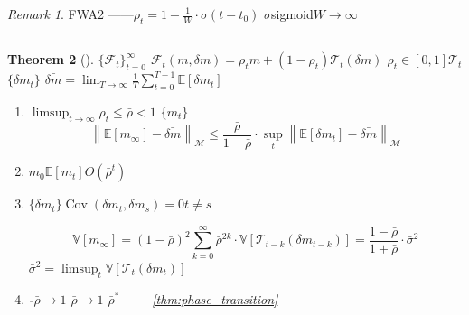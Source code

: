\documentclass[11pt,a4paper]{article}
\newtheorem{theorem}{Theorem}[section]
\theoremstyle{remark}
\newtheorem{remark}[theorem]{Remark}
\DeclareMathOperator{\Cov}{Cov}
\newcommand{\Mmem}{\mathcal{M}}
\newcommand{\Fforget}{\mathcal{F}}
\newcommand{\E}{\mathbb{E}}
\newcommand{\V}{\mathbb{V}}
\newcommand{\norm}[1]{\left\lVert#1\right\rVert}
\begin{document}
\begin{remark}
FWA2
——$\rho_t = 1 - \frac{1}{W} \cdot \sigma(t - t_0)$
$\sigma$sigmoid$W \to \infty$
\end{remark}

\subsection{}



\begin{theorem}[]\label{thm:convergence}
$\{\Fforget_t\}_{t=0}^{\infty}$
$\Fforget_t(m, \delta m) = \rho_t m + (1-\rho_t)\mathcal{T}_t(\delta m)$
$\rho_t \in [0, 1]$$\mathcal{T}_t$
$\{\delta m_t\}$
$\bar{\delta m} = \lim_{T \to \infty} \frac{1}{T}\sum_{t=0}^{T-1}\E[\delta m_t]$


\begin{enumerate}[label=(\arabic*)]
    \item \textbf{}$\limsup_{t \to \infty} \rho_t \leq \bar{\rho} < 1$
          $\{m_t\}$
          \begin{equation}
              \norm{\E[m_\infty] - \bar{\delta m}}_{\Mmem}
              \leq \frac{\bar{\rho}}{1-\bar{\rho}} \cdot \sup_t \norm{\E[\delta m_t] - \bar{\delta m}}_{\Mmem}
          \end{equation}
    \item \textbf{}$m_0$$\E[m_t]$$O(\bar{\rho}^t)$
          
    \item \textbf{}$\{\delta m_t\}$$\Cov(\delta m_t, \delta m_s) = 0$$t \neq s$
          
          \begin{equation}
              \V[m_\infty] = (1-\bar{\rho})^2 \sum_{k=0}^{\infty} \bar{\rho}^{2k} \cdot \V[\mathcal{T}_{t-k}(\delta m_{t-k})]
              = \frac{1-\bar{\rho}}{1+\bar{\rho}} \cdot \bar{\sigma}^2
          \end{equation}
          $\bar{\sigma}^2 = \limsup_t \V[\mathcal{T}_t(\delta m_t)]$
    \item \textbf{-}$\bar{\rho} \to 1$
          $\bar{\rho} \to 1$
          $\bar{\rho}^*$——~\ref{thm:phase_transition}
          
\end{enumerate}
\end{theorem}
\end{document}
